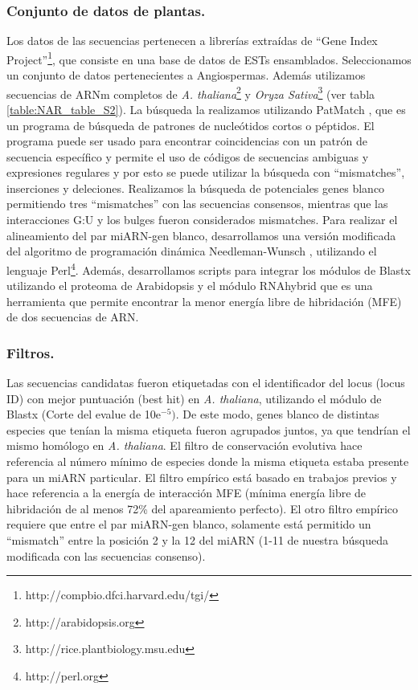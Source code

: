 \subsubsection{Conjunto de datos de plantas.}
Los datos de las secuencias pertenecen a librerías extraídas de ``Gene Index Project''\footnote{http://compbio.dfci.harvard.edu/tgi/}, que consiste en una base de datos de ESTs ensamblados.
Seleccionamos un conjunto de datos pertenecientes a Angiospermas.
Además utilizamos secuencias de ARNm completos de \textit{A. thaliana}\footnote{http://arabidopsis.org} y \textit{Oryza Sativa}\footnote{http://rice.plantbiology.msu.edu} (ver tabla \ref{table:NAR_table_S2}).
La búsqueda la realizamos utilizando PatMatch \citep{Yan01072005}, que es un programa de búsqueda de patrones de nucleótidos cortos o péptidos.
El programa puede ser usado para encontrar coincidencias con un patrón de secuencia específico y permite el uso de códigos de secuencias ambiguas y expresiones regulares y por esto se puede utilizar la búsqueda con ``mismatches'', inserciones y deleciones.
Realizamos la búsqueda de potenciales genes blanco permitiendo tres ``mismatches'' con las secuencias consensos, mientras que las interacciones G:U y los bulges fueron considerados mismatches.
Para realizar el alineamiento del par miARN-gen blanco, desarrollamos una versión modificada del algoritmo de programación dinámica Needleman-Wunsch \citep{Needleman1970443}, utilizando el lenguaje Perl\footnote{http://perl.org}.
Además, desarrollamos scripts para integrar los módulos de Blastx \citep{Altschup1990} utilizando el proteoma de Arabidopsis y el módulo RNAhybrid \citep{Giegerich2004} que es una herramienta que permite encontrar la menor energía libre de hibridación (MFE) de dos secuencias de ARN.

\subsubsection{Filtros.}
Las secuencias candidatas fueron etiquetadas con el identificador del locus (locus ID) con mejor puntuación (best hit) en \textit{A. thaliana}, utilizando el módulo de Blastx (Corte del evalue de 10e$^{-5})$.
De este modo, genes blanco de distintas especies que tenían la misma etiqueta fueron agrupados juntos, ya que tendrían el mismo homólogo en \textit{A. thaliana}.
El filtro de conservación evolutiva hace referencia al número mínimo de especies donde la misma etiqueta estaba presente para un miARN particular.
El filtro empírico está basado en trabajos previos \citep{Schwab2005517} y hace referencia a la energía de interacción MFE (mínima energía libre de hibridación de al menos 72\% del apareamiento perfecto).
El otro filtro empírico requiere que entre el par miARN-gen blanco, solamente está permitido un ``mismatch'' entre la posición 2 y la 12 del miARN (1-11 de nuestra búsqueda modificada con las secuencias consenso).

